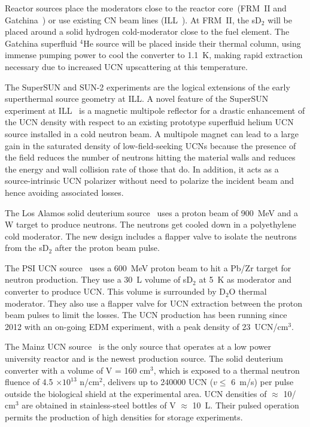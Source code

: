 Reactor sources place the moderators close to the reactor core~(FRM~II
and Gatchina~\cite{Serebrov_ascona}) or use existing CN beam lines
(ILL~\cite{Piegsa2014}). At FRM~II, the sD$_2$ will be placed
around a solid hydrogen cold-moderator close to the fuel element. The
Gatchina superfluid $^4$He source will be placed inside their thermal
column, using immense pumping power to cool the converter to 1.1~K,
making rapid extraction necessary due to increased UCN upscattering at
this temperature.

The SuperSUN and SUN-2 experiments are the logical extensions of the
early superthermal source geometry at ILL.  A novel feature of the
SuperSUN experiment at ILL~\cite{Zimmer2015} is a magnetic
multipole reflector for a drastic enhancement of the UCN density with
respect to an existing prototype superfluid helium UCN source
installed in a cold neutron beam. A multipole magnet can lead to a
large gain in the saturated density of low-field-seeking UCNs because
the presence of the field reduces the number of neutrons hitting the
material walls and reduces the energy and wall collision rate of those
that do. In addition, it acts as a source-intrinsic UCN polarizer
without need to polarize the incident beam and hence avoiding
associated losses.

The Los Alamos solid deuterium source~\cite{Ito_ascona} uses a
proton beam of 900~MeV and a W target to produce neutrons. The
neutrons get cooled down in a polyethylene cold moderator. The new
design includes a flapper valve to isolate the neutrons from the
sD$_2$ after the proton beam pulse.

The PSI UCN source~\cite{Ries_ascona} uses a 600~MeV proton beam
to hit a Pb/Zr target for neutron production. They use a 30~L volume
of sD$_2$ at 5~K as moderator and converter to produce UCN. This
volume is surrounded by D$_2$O thermal moderator. They also use a
flapper valve for UCN extraction between the proton beam pulses to
limit the losses. The UCN production has been running since 2012 with
an on-going EDM experiment, with a peak density of 23~UCN/cm$^3$.

The Mainz UCN source~\cite{Karch2014} is the only source that
operates at a low power university reactor and is the newest
production source. The solid deuterium converter with a volume of V =
160 cm$^3$, which is exposed to a thermal neutron fluence of 4.5
$\times 10^{13}$ n/cm$^2$, delivers up to 240000 UCN ($v \leq$ 6~m/s)
per pulse outside the biological shield at the experimental area.  UCN
densities of $\approx$ 10/ cm$^3$ are obtained in stainless-steel
bottles of V $\approx$ 10~L. Their pulsed operation permits the
production of high densities for storage experiments.


